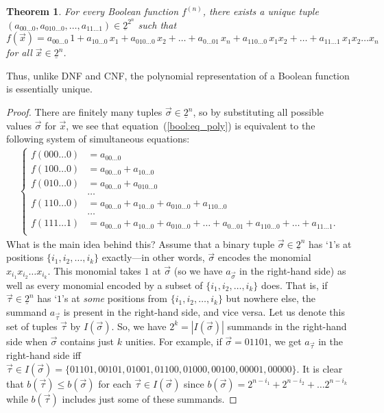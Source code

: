 \documentclass[12pt,notitlepage]{article}
\theoremstyle{plain}
\newtheorem{thm}{Theorem}[section]
\theoremstyle{definition}
\theoremstyle{plain}
\newcommand{\ul}[1]{\underline{#1}}
\newcommand{\1}{\mathbf{1}}
\newcommand{\0}{\mathbf{0}}
\begin{document}
\begin{thm}\label{bool:zhegalkin}
For every Boolean function $f^{(n)}$, there exists a unique tuple $(a_{00\ldots0}, a_{010\ldots0}, \ldots, a_{11\ldots1}) \in \ul{2}^{2^n}$ such that
\begin{equation}\label{bool:eq_poly}
f(\vec x) = a_{00\ldots0}\, 1 + a_{10\ldots0}\, x_1 + a_{010\ldots0}\, x_2 + \ldots + a_{0\ldots01}\, x_n + a_{110\ldots0}\, x_1 x_2 + \ldots + a_{11\ldots 1}\, x_1 x_2\ldots x_n
\end{equation}
for all $\vec x \in \ul{2}^n$.
\end{thm}
Thus, unlike DNF and CNF, the polynomial representation of a Boolean function is essentially unique.
\begin{proof}
There are finitely many tuples $\vec \sigma \in \ul{2}^n$, so by substituting all possible values $\vec \sigma$ for $\vec x$, we see that equation~(\ref{bool:eq_poly}) is equivalent to the following system of simultaneous equations:
\begin{equation}\label{bool:eq_sle}
\begin{array}{l}
\begin{cases}
	 f(000\ldots0) &= a_{00\ldots0}\\
	 f(100\ldots0) &= a_{00\ldots0} + a_{10\ldots0}\\
	 f(010\ldots0) &= a_{00\ldots0} + a_{010\ldots0}\\
	 &\ldots\\
	 f(110\ldots0) &= a_{00\ldots0} + a_{10\ldots0} + a_{010\ldots0} + a_{110\ldots0}\\
	 &\ldots\\
	 f(111\ldots1) &= a_{00\ldots0} + a_{10\ldots0} + a_{010\ldots0} + \ldots + a_{0\ldots01} + a_{110\ldots0} + \ldots + a_{11\ldots 1}.\\
\end{cases}
\end{array}
\end{equation}
What is the main idea behind this? Assume that a binary tuple $\vec \sigma \in \ul{2}^n$ has `$1$'s at positions $\{i_1, i_2, \ldots, i_k\}$ exactly---in other words, $\vec \sigma$ encodes the monomial $x_{i_1} x_{i_2} \ldots x_{i_k}$. This monomial takes $1$ at $\vec\sigma$ (so we have $a_{\vec \sigma}$ in the right-hand side) as well as every monomial encoded by a subset of $\{i_1, i_2, \ldots, i_k\}$ does. That is, if $\vec \tau \in \ul{2}^n$ has `$1$'s at \emph{some} positions from $\{i_1, i_2, \ldots, i_k\}$ but nowhere else, the summand $a_{\vec \tau}$ is present in the right-hand side, and vice versa. Let us denote this set of tuples $\vec \tau$ by $I(\vec \sigma)$. So, we have $2^k = |I(\vec \sigma)|$ summands in the right-hand side when $\vec \sigma$ contains just $k$ unities. For example, if $\vec \sigma = 01101$, we get $a_{\vec \tau}$ in the right-hand side iff $\vec\tau \in I(\vec{\sigma}) = \{01101, 00101, 01001, 01100, 01000, 00100, 00001, 00000\}$. It is clear that $b(\vec \tau) \leq b(\vec \sigma)$ for each $\vec \tau \in I(\vec \sigma)$ since $b(\vec \sigma) = 2^{n - i_1} + 2^{n - i_2} + \ldots 2^{n - i_k}$ while $b(\vec \tau)$ includes just some of these summands.


\end{proof}
\end{document}

